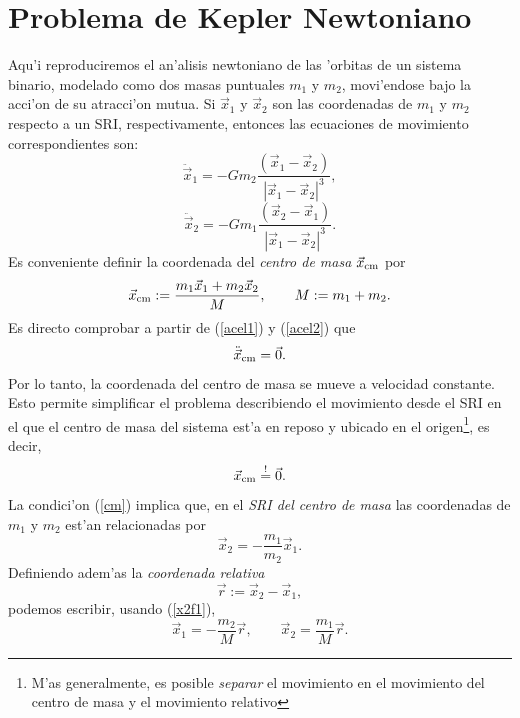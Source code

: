 
\chapter{Problema de Kepler Newtoniano}\label{app:Kepler}

Aqu'i reproduciremos el an'alisis newtoniano de las 'orbitas de un sistema binario, modelado como dos masas puntuales $m_1$ y $m_2$, movi'endose bajo la acci'on de su atracci'on mutua. Si $\vec{x}_1$ y $\vec{x}_2$ son las coordenadas de $m_1$ y $m_2$ respecto a un SRI, respectivamente, entonces las ecuaciones de movimiento correspondientes son:
\begin{equation}
\ddot{\vec{x}}_1=-Gm_2\frac{(\vec{x}_1-\vec{x}_2)}{|\vec{x}_1-\vec{x}_2|^3} ,\label{acel1}
\end{equation}
\begin{equation}
\ddot{\vec{x}}_2=-Gm_1\frac{(\vec{x}_2-\vec{x}_1)}{|\vec{x}_1-\vec{x}_2|^3} .\label{acel2}
\end{equation}
Es conveniente definir la coordenada del \textit{centro de masa} $\vec{x}_{\rm cm}$ por
\begin{equation}
\vec{x}_{\rm cm}:=\frac{m_1\vec{x}_1+m_2\vec{x}_2}{M}, \qquad M:=m_1+m_2.
\end{equation}
Es directo comprobar a partir de (\ref{acel1}) y (\ref{acel2}) que
\begin{equation}
\ddot{\vec{x}}_{\rm cm}=\vec{0}.
\end{equation}
Por lo tanto, la coordenada del centro de masa se mueve a velocidad constante. Esto permite simplificar el problema describiendo el movimiento desde el SRI en el que el centro de masa del sistema est'a en reposo y ubicado en el origen\footnote{M'as generalmente, es posible \textit{separar} el movimiento en el movimiento del centro de masa y el movimiento relativo}, es decir,
\begin{equation}
\vec{x}_{\rm cm}\stackrel{!}{=}\vec{0}. \label{cm}
\end{equation}
La condici'on (\ref{cm}) implica que, en el \textit{SRI del centro de masa} las coordenadas de $m_1$ y $m_2$ est'an relacionadas por
\begin{equation}
\vec{x}_2=-\frac{m_1}{m_2}\vec{x}_1. \label{x2f1}
\end{equation}
Definiendo adem'as la \textit{coordenada relativa}
\begin{equation}
\vec{r}:=\vec{x}_2-\vec{x}_1,
\end{equation}
podemos escribir, usando (\ref{x2f1}),
\begin{equation}\label{x12fr}
\vec{x}_1=-\frac{m_2}{M}\vec{r}, \qquad \vec{x}_2=\frac{m_1}{M}\vec{r}.
\end{equation}
